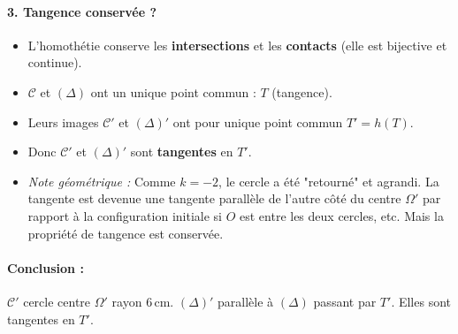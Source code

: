 \documentclass[11pt]{article}
\begin{document}
\begin{exoresolu}
\paragraph{3. Tangence conservée ?}
\begin{itemize}
    \item L'homothétie conserve les \textbf{intersections} et les \textbf{contacts} (elle est bijective et continue).
    \item $\mathcal{C}$ et $(\Delta)$ ont un unique point commun : $T$ (tangence).
    \item Leurs images $\mathcal{C}'$ et $(\Delta)'$ ont pour unique point commun $T' = h(T)$.
    \item Donc $\mathcal{C}'$ et $(\Delta)'$ sont \textbf{tangentes} en $T'$.
    \item \textit{Note géométrique :} Comme $k=-2$, le cercle a été "retourné" et agrandi. La tangente est devenue une tangente parallèle de l'autre côté du centre $\Omega'$ par rapport à la configuration initiale si $O$ est entre les deux cercles, etc. Mais la propriété de tangence est conservée.
\end{itemize}
\paragraph{Conclusion :} $\mathcal{C}'$ cercle centre $\Omega'$ rayon $6\,\text{cm}$. $(\Delta)'$ parallèle à $(\Delta)$ passant par $T'$. Elles sont tangentes en $T'$.
\end{exoresolu}
\end{document}
